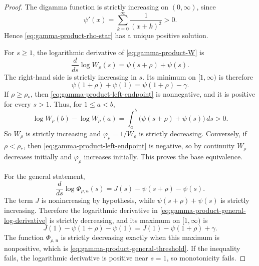 \documentclass[11pt]{article}
\numberwithin{equation}{section}
\theoremstyle{definition}
\theoremstyle{remark}
\newcommand{\1}{\mathbf 1}
\begin{document}
\begin{proof}
The digamma function is strictly increasing on \((0,\infty)\), since
\begin{equation}
\label{eq:digamma-positive-series}
\psi'(x)=\sum_{k=0}^{\infty}\frac{1}{(x+k)^2}>0.
\end{equation}
Hence \eqref{eq:gamma-product-rho-star} has a unique positive solution.

For \(s\ge1\), the logarithmic derivative of
\eqref{eq:gamma-product-W} is
\begin{equation}
\label{eq:gamma-product-log-derivative}
\frac{d}{ds}\log W_\rho(s)=\psi(s+\rho)+\psi(s).
\end{equation}
The right-hand side is strictly increasing in \(s\).  Its minimum on
\([1,\infty)\) is therefore
\begin{equation}
\label{eq:gamma-product-left-endpoint}
\psi(1+\rho)+\psi(1)=\psi(1+\rho)-\gamma.
\end{equation}
If \(\rho\ge\rho_*\), then \eqref{eq:gamma-product-left-endpoint} is
nonnegative, and it is positive for every \(s>1\).  Thus, for
\(1\le a<b\),
\begin{equation}
\label{eq:gamma-product-integrated-positive}
\log W_\rho(b)-\log W_\rho(a)
=\int_a^b\bigl(\psi(s+\rho)+\psi(s)\bigr)\,ds>0.
\end{equation}
So \(W_\rho\) is strictly increasing and \(\varphi_\rho=1/W_\rho\) is
strictly decreasing.  Conversely, if \(\rho<\rho_*\), then
\eqref{eq:gamma-product-left-endpoint} is negative, so by continuity
\(W_\rho\) decreases initially and \(\varphi_\rho\) increases initially.
This proves the base equivalence.

For the general statement,
\begin{equation}
\label{eq:gamma-product-general-log-derivative}
\frac{d}{ds}\log\Phi_{\rho,u}(s)
=J(s)-\psi(s+\rho)-\psi(s).
\end{equation}
The term \(J\) is nonincreasing by hypothesis, while
\(\psi(s+\rho)+\psi(s)\) is strictly increasing.  Therefore the logarithmic
derivative in \eqref{eq:gamma-product-general-log-derivative} is strictly
decreasing, and its maximum on \([1,\infty)\) is
\begin{equation}
\label{eq:gamma-product-general-left-endpoint}
J(1)-\psi(1+\rho)-\psi(1)
=J(1)-\psi(1+\rho)+\gamma.
\end{equation}
The function \(\Phi_{\rho,u}\) is strictly decreasing exactly when this maximum
is nonpositive, which is \eqref{eq:gamma-product-general-threshold}.  If the
inequality fails, the logarithmic derivative is positive near \(s=1\), so
monotonicity fails.
\end{proof}
\end{document}
